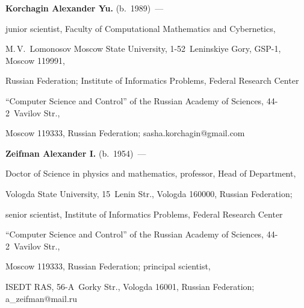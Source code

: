  \vspace*{3pt}





\noindent


\textbf{Korchagin Alexander Yu.} (b.\ 1989)~---


junior scientist, Faculty of Computational Mathematics and Cybernetics, 


M.\,V.~Lomonosov Moscow State University, 1-52~Leninskiye Gory, GSP-1, Moscow 119991, 


Russian Federation; Institute of Informatics Problems, Federal Research Center 


``Computer Science and Control'' of the Russian Academy of Sciences, 44-2~Vavilov Str., 


Moscow 119333, Russian Federation; \mbox{sasha.korchagin@gmail.com}





\vspace*{3pt}





\noindent


\textbf{Zeifman Alexander I.} (b.\ 1954)~---


Doctor of Science in physics and mathematics, professor, Head of Department, 


Vologda State University, 15~Lenin Str., Vologda 160000, Russian Federation; 


senior scientist, Institute of Informatics Problems, Federal Research Center 


``Computer Science and Control'' of the Russian Academy of Sciences, 44-2~Vavilov Str., 


Moscow 119333, Russian Federation; principal scientist, 


ISEDT RAS, 56-A~Gorky Str., Vologda 16001, Russian Federation; a\_zeifman@mail.ru


\label{end\stat}








\renewcommand{\bibname}{\protect\rm Литература} 


